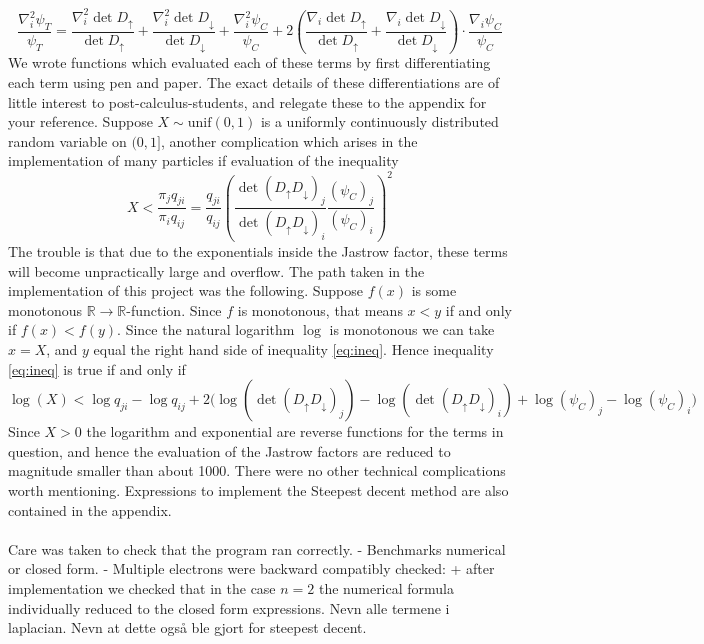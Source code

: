 \documentclass[11pt,english,a4paper]{article}
\begin{document}
 \[
\frac{\nabla_i^2 \psi_T}{\psi_T} = \frac{\nabla_i^2 \det D_\uparrow}{\det D_\uparrow} + \frac{\nabla_i^2 \det D_\downarrow}{\det D_\downarrow} + \frac{\nabla_i^2 \psi_C}{\psi_C} + 2\left( \frac{\nabla_i \det D_\uparrow}{\det D_\uparrow} + \frac{\nabla_i \det D_\downarrow}{\det D_\downarrow} \right) \cdot \frac{\nabla_i \psi_C}{\psi_C}
\]
We wrote functions which evaluated each of these terms by first differentiating each term using pen and paper. The exact details of these differentiations are of little interest to post-calculus-students, and relegate these to the appendix for your reference. Suppose $X \sim \mathrm{unif}(0,1)$ is a uniformly continuously distributed random variable on $(0,1]$, another complication which arises in the implementation of many particles if evaluation of the inequality 
\begin{equation}
X < \frac{\pi_jq_{ji}}{\pi_i q_{ij}} = \frac{q_{ji}}{q_{ij}} \left( \frac{\det(D_\uparrow D_\downarrow)_j }{\det(D_\uparrow D_\downarrow)_i} \frac{(\psi_C)_j}{(\psi_C)_i} \right)^2 \label{eq:ineq}
\end{equation}
The trouble is that due to the exponentials inside the Jastrow factor, these terms will become unpractically large and overflow. The path taken in the implementation of this project was the following. Suppose $f(x)$ is some monotonous $\mathbb{R} \to \mathbb{R}$-function. Since $f$ is monotonous, that means $x < y$ if and only if $f(x) < f(y)$. Since the natural logarithm $\log$ is monotonous we can take $x = X$, and $y$ equal the right hand side of inequality \eqref{eq:ineq}. Hence inequality \eqref{eq:ineq} is true if and only if 
\[
\log(X) < \log q_{ji} - \log q_{ij} + 2\big(\log( \det(D_\uparrow D_\downarrow)_j) - \log( \det(D_\uparrow D_\downarrow)_i) + \log (\psi_C)_j - \log (\psi_C)_i \big)
\]
Since $X > 0$ the logarithm and exponential are reverse functions for the terms in question, and hence the evaluation of the Jastrow factors are reduced to magnitude smaller than about 1000. There were no other technical complications worth mentioning. Expressions to implement the Steepest decent method are also contained in the appendix.\\
\\
Care was taken to check that the program ran correctly. 
- Benchmarks numerical or closed form.
- Multiple electrons were backward compatibly checked:
+ after implementation we checked that in the case $n=2$ the numerical formula individually reduced to the closed form expressions. Nevn alle termene i laplacian. Nevn at dette også ble gjort for steepest decent.
\end{document}

